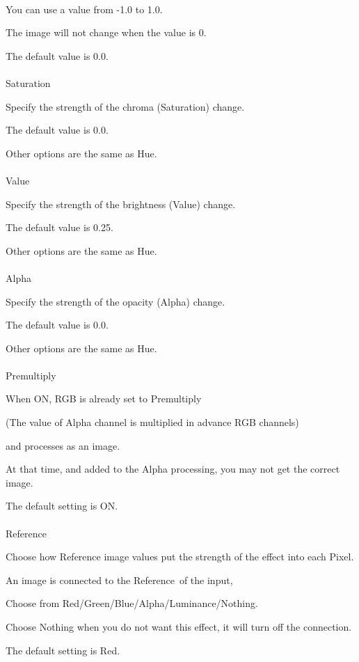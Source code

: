 \documentclass[a4paper,12pt]{article}
\begin{document}
\ \vspace{-0.2em}
\par
You can use a value from -1.0 to 1.0.\par
The image will not change when the value is 0.\par
The default value is 0.0.\\
\\
Saturation\par
Specify the strength of the chroma (Saturation) change.\par
The default value is 0.0.\par
Other options are the same as \textquotedbl Hue\textquotedbl .\\
\\
Value\par
Specify the strength of the brightness (Value) change.\par
The default value is 0.25.\par
Other options are the same as \textquotedbl Hue\textquotedbl .\\
\\
Alpha\par
Specify the strength of the opacity (Alpha) change.\par
The default value is 0.0.\par
Other options are the same as \textquotedbl Hue\textquotedbl .\\
\\
Premultiply\par
When ON, RGB is already set to Premultiply\par
(The value of Alpha channel is multiplied in advance RGB channels)\par
and processes as an image.\par
At that time, and added to the Alpha processing, you may not get the correct image.\par
The default setting is ON.\\
\\
Reference\par
Choose how Reference image values put the strength of the effect into each Pixel.\par
An image is connected to the \textquotedbl Reference\textquotedbl \ of the input,\par
Choose from Red/Green/Blue/Alpha/Luminance/Nothing.\par
Choose Nothing when you do not want this effect, it will turn off the connection.\par
The default setting is Red.
\end{document}
